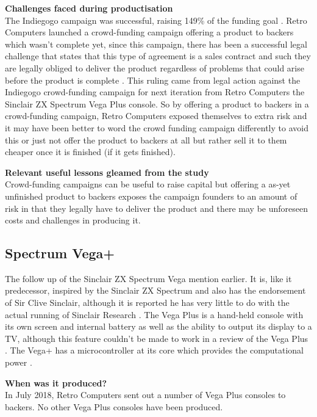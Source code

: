 \textbf{Challenges faced during productisation}\\
The Indiegogo campaign was successful, raising 149\% of the funding goal 
\cite{RN119}. 
Retro Computers launched a crowd-funding campaign offering a product to backers which wasn't complete yet, since this campaign, there has been a successful legal challenge that states that this type of agreement is a sales contract and such they are legally obliged to deliver the product regardless of problems that could arise before the product is complete 
\cite{RN122}. This ruling came from legal action against the Indiegogo crowd-funding campaign for next iteration from Retro Computers the Sinclair ZX Spectrum Vega Plus console. So by offering a product to backers in a crowd-funding campaign, Retro Computers exposed themselves to extra risk and it may have been better to word the crowd funding campaign differently to avoid this or just not offer the product to backers at all but rather sell it to them cheaper once it is finished (if it gets finished).

\textbf{Relevant useful lessons gleamed from the study}\\
Crowd-funding campaigns can be useful to raise capital but offering a as-yet unfinished product to backers exposes the campaign founders to an amount of risk in that they legally have to deliver the product and there may be unforeseen costs and challenges in producing it.

\subsection{Spectrum Vega+}

The follow up of the Sinclair ZX Spectrum Vega mention earlier. It is, like it predecessor, inspired by the Sinclair ZX Spectrum and also has the endorsement of Sir Clive Sinclair, although it is reported he has very little to do with the actual running of Sinclair Research 
\cite{RN123}. The Vega Plus is a hand-held console with its own screen and internal battery as well as the ability to output its display to a TV, although this feature couldn't be made to work in a review of the Vega Plus 
\cite{RN117}. The Vega+ has a microcontroller at its core which provides the computational power 
\cite{RN143}.

\textbf{When was it produced?}\\
In July 2018, Retro Computers sent out a number of Vega Plus consoles to backers. No other Vega Plus consoles have been produced.

